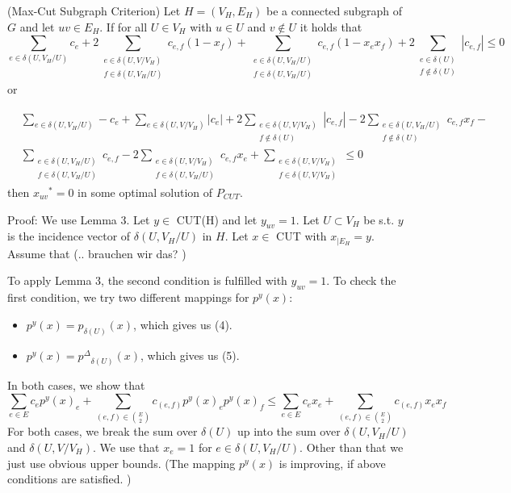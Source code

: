 \begin{theorem}{(Max-Cut Subgraph Criterion)}
Let $H=(V_H,E_H)$ be a connected subgraph of $G$ and let $uv \in E_H$. If for all $U \in V_H$ with $u \in U$ and $v \notin U$ it holds that 
\begin{equation}
    \sum_{e \in \delta(U, V_H / U)} c_e + 2 \sum_{ \substack{e \in \delta(U,V/V_H) \\ f \in \delta(U, V_H / U)}} c_{e,f} (1-x_f) + \sum_{ \substack{e \in \delta(U, V_H / U) \\ f \in \delta(U, V_H / U)}} c_{e,f} (1-x_e x_f) +2 \sum_{ \substack{e \in \delta(U) \\ f \notin \delta(U)}} |c_{e,f}| \leq 0 
\end{equation}
or 

\begin{align}
    & \sum_{e \in \delta(U,V_H/U)} - c_e +\sum_{e \in \delta(U,V/V_H)} |c_e| 
    + 2 \sum_{ \substack{ e \in \delta(U,V/V_H) \\ f \notin \delta(U)}} |c_{e,f}| - 2  \sum_{ \substack{ e \in \delta(U,V_H/U) \\ f \notin \delta(U)}} c_{e,f} x_f - & \\ & \sum_{ \substack{ e \in \delta(U,V_H/U) \\ f \in \delta(U, V_H/U)}} c_{e,f} - 2 \sum_{ \substack{ e \in \delta(U,V/V_H) \\ f \in \delta(U, V_H/U)}} c_{e,f} x_e + \sum_{ \substack{ e \in \delta(U,V/V_H) \\ f \in \delta(U, V/V_H)}} \leq 0 
\end{align}  
then ${x_{uv}}^*=0$ in some optimal solution of $P_{CUT}$.
\end{theorem}
Proof: We use Lemma 3. Let $y \in$ CUT(H) and let $y_{uv}=1$. Let $U \subset V_H$ be s.t. $y$ is the incidence vector of $\delta(U,V_H/U)$ in $H$. Let $x \in$ CUT with $x_{|E_H} =y$. 
Assume that (.. brauchen wir das? ) 

To apply Lemma 3, the second condition is fulfilled with $y_{uv}=1$. 
To check the first condition, we try two different mappings for $p^y(x)$: 
\begin{itemize}
    \item $p^y(x) = {p_{\delta(U)}}(x)$, which gives us (4).
    \item $p^y(x)= {p^{\Delta}}_{\delta(U)}(x)$, which gives us (5).
\end{itemize}

In both cases, we show that 
\begin{equation*}
    \sum_{e \in E} c_e {p^y(x)}_e + \sum_{(e,f) \in {E \choose 2}} c_{(e,f)} p^y(x)_e p^y(x)_f \leq \sum_{e \in E} c_e x_e + \sum_{(e,f) \in {E \choose 2}} c_{(e,f)} x_e x_f
\end{equation*}
For both cases, we break the sum over $\delta(U)$ up into the sum over $\delta(U,V_H/U) $ and $\delta(U,V/V_H) $. 
We use that $x_e=1$ for $e \in \delta(U,V_H/U)$. Other than that we just use obvious upper bounds. 
(The mapping $p^y(x)$ is improving, if above conditions are satisfied. )


